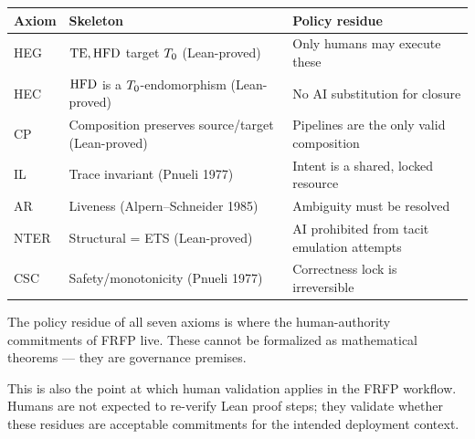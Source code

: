 \begin{center}
\begin{tabular}{p{1cm}p{5.5cm}p{5.5cm}}
\toprule
Axiom & Skeleton & Policy residue \\
\midrule
HEG  & $\mathrm{TE}, \mathrm{HFD}$ target $T_0$ (Lean-proved) & Only humans may execute these \\
HEC  & $\mathrm{HFD}$ is a $T_0$-endomorphism (Lean-proved) & No AI substitution for closure \\
CP   & Composition preserves source/target (Lean-proved) & Pipelines are the only valid composition \\
IL   & Trace invariant (Pnueli 1977) & Intent is a shared, locked resource \\
AR   & Liveness (Alpern--Schneider 1985) & Ambiguity must be resolved \\
NTER & Structural = ETS (Lean-proved) & AI prohibited from tacit emulation attempts \\
CSC  & Safety/monotonicity (Pnueli 1977) & Correctness lock is irreversible \\
\bottomrule
\end{tabular}
\end{center}

The policy residue of all seven axioms is where the human-authority commitments
of FRFP live. These cannot be formalized as mathematical theorems --- they are
governance premises.

This is also the point at which human validation applies in the FRFP workflow.
Humans are not expected to re-verify Lean proof steps; they validate whether these
residues are acceptable commitments for the intended deployment context.

